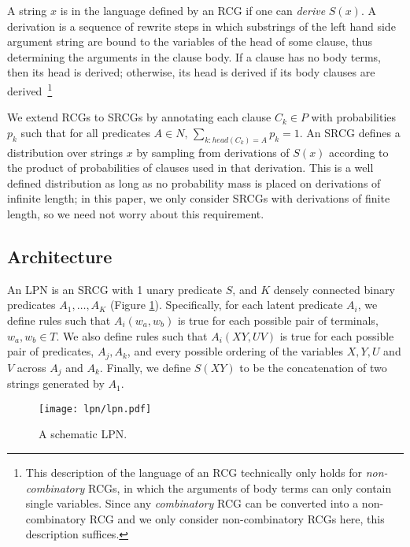 \documentclass[11pt, twocolumn]{article}
\begin{document}
A string $x$ is in the language defined by an RCG if one can
\emph{derive} $S(x)$. A derivation is a sequence of rewrite steps in
which substrings of the left hand side argument string are bound to
the variables of the head of some clause, thus determining the
arguments in the clause body. If a clause has no body terms, then its
head is derived; otherwise, its head is derived if its body clauses
are derived~\footnote{This description of the language of an RCG
  technically only holds for \emph{non-combinatory} RCGs, in which the
  arguments of body terms can only contain single variables. Since any
  \emph{combinatory} RCG can be converted into a non-combinatory RCG
  and we only consider non-combinatory RCGs here, this description
  suffices.}

We extend RCGs to SRCGs by annotating each clause $C_k \in P$ with
probabilities $p_k$ such that for all predicates ${A \in N, \,
  \sum_{k:head(C_k)=A} p_k = 1}$. An SRCG defines a distribution over
strings $x$ by sampling from derivations of $S(x)$ according to the
product of probabilities of clauses used in that derivation. This is a
well defined distribution as long as no probability mass is placed on
derivations of infinite length; in this paper, we only consider SRCGs
with derivations of finite length, so we need not worry about this
requirement.

\subsection{Architecture}

An LPN is an SRCG with 1 unary predicate $S$, and $K$ densely
connected binary predicates $A_1, \dots, A_K$ (Figure
\ref{fig:architecture}).  Specifically, for each latent predicate
$A_i$, we define rules such that $A_i(w_a,w_b)$ is true for each
possible pair of terminals, $w_a,w_b \in T$. We also define rules such
that $A_i(XY,UV)$ is true for each possible pair of predicates,
$A_j,A_k$, and every possible ordering of the variables $X,Y,U$ and
$V$ across $A_j$ and $A_k$. Finally, we define $S(XY)$ to be the
concatenation of two strings generated by $A_1$.
 
\begin{figure}[t]
		\texttt{[image: lpn/lpn.pdf]}
		\caption{A schematic LPN.}
		\label{fig:architecture}
\end{figure}

\end{document}
